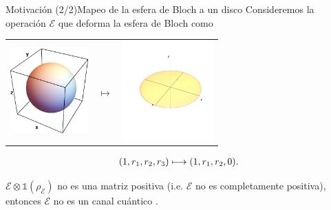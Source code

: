 \documentclass[xcolor=dvipsnames,presentation]{beamer}%
\begin{document}
\begin{frame}{Motivación (2/2)}{Mapeo de la esfera de Bloch a un disco} \pause
	Consideremos la operación $\mathcal{E}$ que deforma
	la esfera de Bloch como
	\begin{center}
	\begin{tabular}{m{2.5cm} m{1cm} m{2.5cm}}
		\includegraphics[width=3cm]{images/bloch-ball}
		& \hfill $\longmapsto$
		& \includegraphics[width=3.5cm]{images/diskXY}
	\end{tabular}
	\end{center}
	\begin{align*}
	\qty(1,r_1,r_2,r_3)\longmapsto\qty(1,r_1,r_2,0).
	\end{align*}
	\pause
		
	$\mathcal{E}\otimes \mathds{1}(\rho_{\mathcal{E}})$
	no es una matriz positiva (i.e. $\mathcal{E}$ no es completamente positiva), 
	entonces $\mathcal{E}$ no es un canal cuántico	. \vspace{.5cm}
\end{frame}
\end{document}
